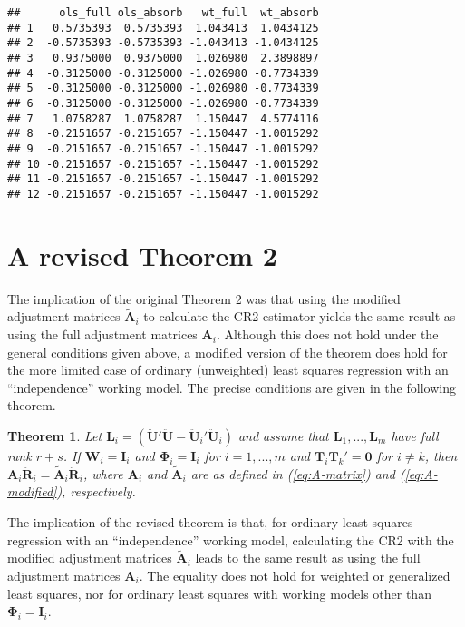 \documentclass[12pt]{article}
\newtheorem*{thm}{Theorem}
\begin{document}
\begin{verbatim}
##      ols_full ols_absorb   wt_full  wt_absorb
## 1   0.5735393  0.5735393  1.043413  1.0434125
## 2  -0.5735393 -0.5735393 -1.043413 -1.0434125
## 3   0.9375000  0.9375000  1.026980  2.3898897
## 4  -0.3125000 -0.3125000 -1.026980 -0.7734339
## 5  -0.3125000 -0.3125000 -1.026980 -0.7734339
## 6  -0.3125000 -0.3125000 -1.026980 -0.7734339
## 7   1.0758287  1.0758287  1.150447  4.5774116
## 8  -0.2151657 -0.2151657 -1.150447 -1.0015292
## 9  -0.2151657 -0.2151657 -1.150447 -1.0015292
## 10 -0.2151657 -0.2151657 -1.150447 -1.0015292
## 11 -0.2151657 -0.2151657 -1.150447 -1.0015292
## 12 -0.2151657 -0.2151657 -1.150447 -1.0015292
\end{verbatim}

\hypertarget{a-revised-theorem-2}{%
\section{A revised Theorem 2}\label{a-revised-theorem-2}}

The implication of the original Theorem 2 was that using the modified
adjustment matrices \(\tilde{\mathbf{A}}_i\) to calculate the CR2
estimator yields the same result as using the full adjustment matrices
\(\mathbf{A}_i\). Although this does not hold under the general
conditions given above, a modified version of the theorem does hold for
the more limited case of ordinary (unweighted) least squares regression
with an ``independence'' working model. The precise conditions are given
in the following theorem.

\begin{thm}
\label{thm:absorb}
Let $\mathbf{L}_i = \left(\mathbf{\ddot{U}}'\mathbf{\ddot{U}} - \mathbf{\ddot{U}}_i'\mathbf{\ddot{U}}_i\right)$ and assume that $\mathbf{L}_1,...,\mathbf{L}_m$ have full rank $r + s$. If $\mathbf{W}_i = \mathbf{I}_i$ and $\boldsymbol\Phi_i = \mathbf{I}_i$ for $i = 1,...,m$ and $\mathbf{T}_i \mathbf{T}_k' = \mathbf{0}$ for $i \neq k$, then $\mathbf{A}_i \mathbf{\ddot{R}}_i = \mathbf{\tilde{A}}_i \mathbf{\ddot{R}}_i$, where $\mathbf{A}_i$ and $\tilde{\mathbf{A}}_i$ are as defined in (\ref{eq:A-matrix}) and (\ref{eq:A-modified}), respectively.
\end{thm}

The implication of the revised theorem is that, for ordinary least
squares regression with an ``independence'' working model, calculating
the CR2 with the modified adjustment matrices \(\tilde{\mathbf{A}}_i\)
leads to the same result as using the full adjustment matrices
\(\mathbf{A}_i\). The equality does not hold for weighted or generalized
least squares, nor for ordinary least squares with working models other
than \(\boldsymbol\Phi_i = \mathbf{I}_i\).
\end{document}
